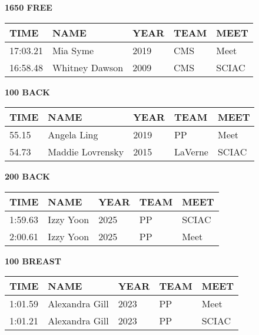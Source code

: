 \vspace{0.4cm}

\begin{minipage}[t]{0.48\textwidth}
\centering
\textbf{1650 FREE}\\[0.05cm]
\begin{tabular}{@{}p{1.8cm}p{2.8cm}p{1.2cm}p{1.4cm}p{1.4cm}@{}}
\hline
\textbf{TIME} & \textbf{NAME} & \textbf{YEAR} & \textbf{TEAM} & \textbf{MEET} \\
\hline
17:03.21 & Mia Syme & 2019 & CMS & Meet \\
16:58.48 & Whitney Dawson & 2009 & CMS & SCIAC \\
\hline
\end{tabular}
\end{minipage}\hfill
\begin{minipage}[t]{0.48\textwidth}
\centering
\textbf{100 BACK}\\[0.05cm]
\begin{tabular}{@{}p{1.8cm}p{2.8cm}p{1.2cm}p{1.4cm}p{1.4cm}@{}}
\hline
\textbf{TIME} & \textbf{NAME} & \textbf{YEAR} & \textbf{TEAM} & \textbf{MEET} \\
\hline
55.15 & Angela Ling & 2019 & PP & Meet \\
54.73 & Maddie Lovrensky & 2015 & LaVerne & SCIAC \\
\hline
\end{tabular}
\end{minipage}

\vspace{0.4cm}

\begin{minipage}[t]{0.48\textwidth}
\centering
\textbf{200 BACK}\\[0.05cm]
\begin{tabular}{@{}p{1.8cm}p{2.8cm}p{1.2cm}p{1.4cm}p{1.4cm}@{}}
\hline
\textbf{TIME} & \textbf{NAME} & \textbf{YEAR} & \textbf{TEAM} & \textbf{MEET} \\
\hline
1:59.63 & Izzy Yoon & 2025 & PP & SCIAC \\
2:00.61 & Izzy Yoon & 2025 & PP & Meet \\
\hline
\end{tabular}
\end{minipage}\hfill
\begin{minipage}[t]{0.48\textwidth}
\centering
\textbf{100 BREAST}\\[0.05cm]
\begin{tabular}{@{}p{1.8cm}p{2.8cm}p{1.2cm}p{1.4cm}p{1.4cm}@{}}
\hline
\textbf{TIME} & \textbf{NAME} & \textbf{YEAR} & \textbf{TEAM} & \textbf{MEET} \\
\hline
1:01.59 & Alexandra Gill & 2023 & PP & Meet \\
1:01.21 & Alexandra Gill & 2023 & PP & SCIAC \\
\hline
\end{tabular}
\end{minipage}

